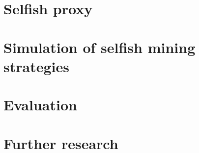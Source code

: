 \documentclass[draft,final]{vutinfth} %
\begin{document}
\chapter{Selfish proxy}


\chapter{Simulation of selfish mining strategies}


\chapter{Evaluation}


\chapter{Further research}





\backmatter

\listoffigures %

\cleardoublepage %
\listoftables %

\cleardoublepage
\lstlistoflistings

\printglossaries



\end{document}
